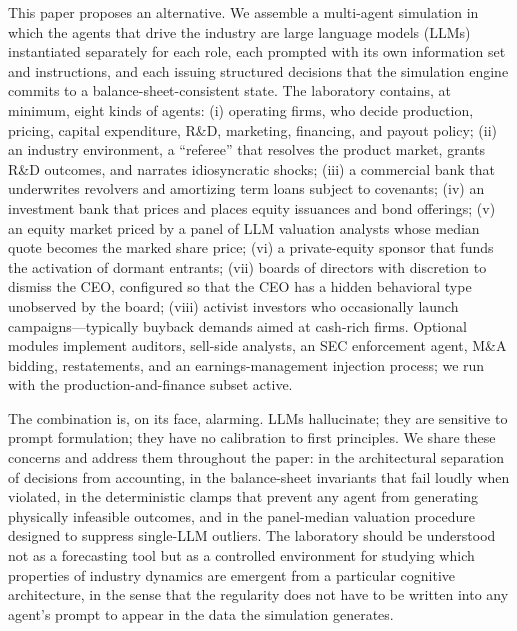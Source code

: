\documentclass[11pt]{article}
\begin{document}
This paper proposes an alternative. We assemble a multi-agent simulation
in which the agents that drive the industry are large language models
(LLMs) instantiated separately for each role, each prompted with its own
information set and instructions, and each issuing structured decisions
that the simulation engine commits to a balance-sheet-consistent state.
The laboratory contains, at minimum, eight kinds of agents: (i) operating
firms, who decide production, pricing, capital expenditure, R\&D,
marketing, financing, and payout policy; (ii) an industry environment, a
``referee'' that resolves the product market, grants R\&D outcomes, and
narrates idiosyncratic shocks; (iii) a commercial bank that underwrites
revolvers and amortizing term loans subject to covenants; (iv) an
investment bank that prices and places equity issuances and bond
offerings; (v) an equity market priced by a panel of LLM valuation
analysts whose median quote becomes the marked share price; (vi) a
private-equity sponsor that funds the activation of dormant entrants;
(vii) boards of directors with discretion to dismiss the CEO, configured
so that the CEO has a hidden behavioral type unobserved by the board;
(viii) activist investors who occasionally launch campaigns---typically
buyback demands aimed at cash-rich firms. Optional modules implement
auditors, sell-side analysts, an SEC enforcement agent, M\&A bidding,
restatements, and an earnings-management injection process; we run with
the production-and-finance subset active.

The combination is, on its face, alarming. LLMs hallucinate; they are
sensitive to prompt formulation; they have no calibration to first
principles. We share these concerns and address them throughout the paper:
in the architectural separation of decisions from accounting, in the
balance-sheet invariants that fail loudly when violated, in the
deterministic clamps that prevent any agent from generating physically
infeasible outcomes, and in the panel-median valuation procedure designed
to suppress single-LLM outliers. The laboratory should be understood not
as a forecasting tool but as a controlled environment for studying which
properties of industry dynamics are emergent from a particular cognitive
architecture, in the sense that the regularity does not have to be
written into any agent's prompt to appear in the data the simulation
generates.
\end{document}

